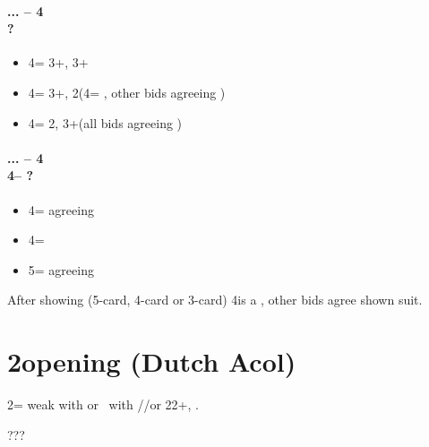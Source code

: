 \documentclass[12pt, a4paper]{report}
\begin{document}
{{        \subsubsection*{... -- 4\diams\\
                        ?}
        \begin{itemize}
            \item 4\hearts = 3+\clubs, 3+\diams
            \item 4\spades = 3+\clubs, 2\diams (4\nt = \soff, other bids agreeing \clubs)
            \item 4\nt = 2\clubs, 3+\diams (all bids agreeing \diams)
        \end{itemize}

        \subsubsection*{... -- 4\diams\\
                        4\hearts -- ?}
        \begin{itemize}
            \item 4\spades = agreeing \clubs
            \item 4\nt = \soff
            \item 5\clubs = agreeing \diams
        \end{itemize}

        \vspace{0.5cm}

        After showing \minor (5-card, 4-card or 3-card) 4\nt is a \soff, other bids
        agree shown suit.
    }

    \chapter*{\colorbox{Plum!30}{2\clubs opening (Dutch Acol)}}
     {

        2\clubs = weak with \diams or \gf\ with \clubs/\hearts/\spades or 22+, \bal.

        ???


}}
\end{document}
